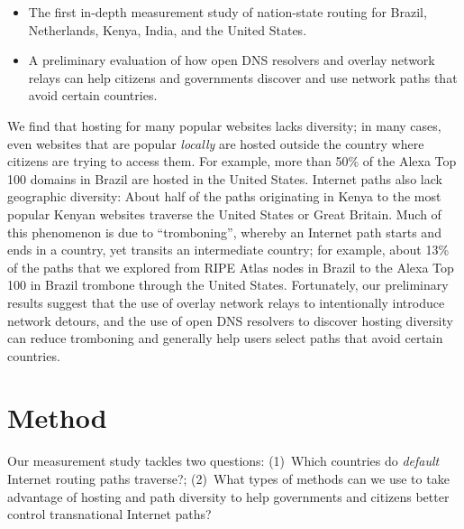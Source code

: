 \begin{itemize}
\item The first in-depth measurement study of
  nation-state routing for Brazil, Netherlands, Kenya, India, and the
  United States. 
\item A preliminary evaluation of how open DNS resolvers and overlay
  network relays can help citizens and governments discover and use
  network paths that avoid certain countries.
\end{itemize}
\noindent
We find that hosting for many popular websites lacks diversity; in many
cases, even websites that are popular {\em locally} are hosted outside
the country where citizens are trying to access them. For example, more
than 50\% of the Alexa Top 100 domains in Brazil are hosted in the
United States. Internet paths also lack geographic diversity: About half
of the paths originating in Kenya to the most popular Kenyan websites
traverse the United States or Great Britain. Much of this phenomenon is
due to ``tromboning'', whereby an Internet path starts and ends in a
country, yet transits an intermediate country; for example, about 13\%
of the paths that we explored from RIPE Atlas nodes in Brazil to the
Alexa Top 100 in Brazil trombone through the United States. Fortunately,
our preliminary results suggest that the use of overlay network relays
to intentionally introduce network detours, and the use of open DNS
resolvers to discover hosting diversity can reduce tromboning and
generally help users select paths that avoid certain countries.

\section{Method}

Our measurement study tackles two questions: (1)~Which countries do {\em
  default} Internet routing paths traverse?; (2)~What types of methods
can we use to take advantage of hosting and path diversity to help governments
and citizens better control transnational Internet paths?

